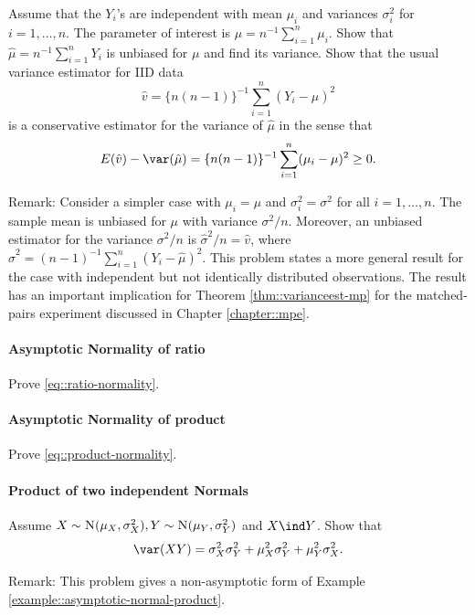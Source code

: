 Assume that the $Y_i$'s are independent with mean $\mu_i$ and variances $\sigma_i^2$ for $i=1,\ldots, n$. The parameter of interest is 
$
\mu = n^{-1} \sum_{i=1}^n \mu_i.
$
Show that 
$
\hat\mu = n^{-1} \sum_{i=1}^n Y_i
$
is unbiased for $\mu$ and find its variance. Show that the usual variance estimator for IID data
$$
\hat{v} = \{  n(n-1) \}^{-1} \sum_{i=1}^n (Y_i -  \hat{\mu})^2
$$
is a conservative estimator for the variance of $\hat\mu$ in the sense that
$$
E(\hat{v}) - \var( \hat\mu ) = \{  n(n-1) \}^{-1} \sum_{i=1}^n (\mu_i - \mu)^2 \geq 0. 
$$

Remark: Consider a simpler case with $\mu_i = \mu$ and $\sigma_i^2 = \sigma^2$ for all $i=1,\ldots, n$. The sample mean is unbiased for $\mu$ with variance $\sigma^2/n$. Moreover, an unbiased estimator for the variance $\sigma^2/n$ is $\hat \sigma^2/n = \hat v$, where $\hat\sigma^2 = (n-1)^{-1} \sum_{i=1}^n (Y_i -  \hat{\mu})^2$. 
This problem states a more general result for the case with independent but not identically distributed observations. The result has an important implication for Theorem \ref{thm::varianceest-mp} for the matched-pairs experiment discussed in Chapter \ref{chapter::mpe}. 





\paragraph{Asymptotic Normality of ratio}\label{hw::asymptotic-normality-ratio}


Prove \eqref{eq::ratio-normality}.


\paragraph{Asymptotic Normality of product}\label{hw::asymptotic-normality-product}


Prove \eqref{eq::product-normality}.


\paragraph{Product of two independent Normals}\label{hw-product-Normals}

Assume $X\sim \textsc{N}(\mu_X, \sigma_X^2), Y\sim \textsc{N}(\mu_Y, \sigma_Y^2)$ and $X\ind Y$. Show that
$$
\var(XY) = \sigma_X^2 \sigma_Y^2 +\mu_X^2 \sigma_Y^2 + \mu_Y^2 \sigma_X^2 .
$$



Remark: This problem gives a non-asymptotic form of Example \ref{example::asymptotic-normal-product}. 




